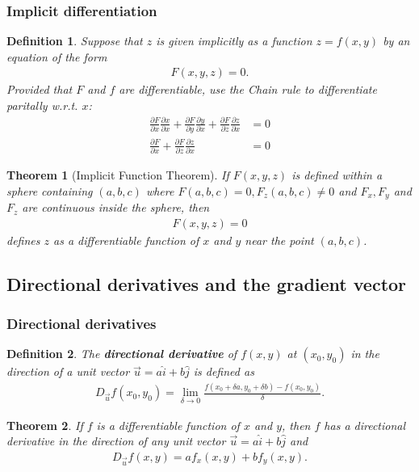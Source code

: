 \documentclass{article}
\theoremstyle{sltheorem}
\newtheorem{definition}{Definition}[section]
\newtheorem{theorem}{Theorem}[section]
\newcommand{\ih}{\widehat i}
\newcommand{\jh}{\widehat j}
\newcommand{\p}{\partial}
\newcommand*\B[1]{\textbf{#1}}
\begin{document}
\subsubsection{Implicit differentiation}
\begin{definition}
    Suppose that $z$ is given implicitly as a function $z=f(x,y)$ by an
    equation of the form
    \begin{align*}
        F(x,y,z)=0.
    \end{align*}
    Provided that $F$ and $f$ are differentiable, use the Chain rule to
    differentiate paritally w.r.t. $x$:
    \begin{align*}
        \frac{\p F}{\p x}\frac{\p x}{\p x}+\frac{\p F}{\p y}\frac{\p y}{\p x}
        + \frac{\p F}{\p z}\frac{\p z}{\p x} &= 0\\
        \frac{\p F}{\p x} + \frac{\p F}{\p z}\frac{\p z}{\p x} &= 0
    \end{align*}
\end{definition}
\begin{theorem}[Implicit Function Theorem]
    If $F(x,y,z)$ is defined within a sphere containing $(a,b,c)$
    where $F(a,b,c)=0, F_z(a,b,c)\not=0$ and $F_x,F_y$ and $F_z$ are
    continuous inside the sphere, then
    \begin{align*}
        F(x,y,z)=0
    \end{align*} 
    defines $z$ as a differentiable function of $x$ and $y$ near the
    point $(a,b,c)$.
\end{theorem}
\subsection{Directional derivatives and the gradient vector}
\subsubsection{Directional derivatives}
\begin{definition}
    The \B{directional derivative} of $f(x,y)$ at $(x_0,y_0)$ in the
    direction of a unit vector $\vec u=a\ih + b\jh$ is defined as
    \begin{align*}
        D_{\vec u}f(x_0, y_0)= \lim_{\delta \to 0}\frac{f(x_0+\delta a, y_0 + \delta b)-f(x_0, y_0)}{\delta}.
    \end{align*}
\end{definition}
\begin{theorem}
    If $f$ is a differentiable function of $x$ and $y$, then $f$
    has a directional derivative in the direction of any unit vector
    $\vec u=a\ih + b\jh$ and
    \begin{align*}
        D_{\vec u}f(x,y) = af_x(x,y) + bf_y(x,y).
    \end{align*}
\end{theorem}
\end{document}
